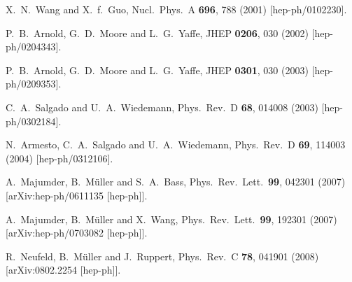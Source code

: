 \documentclass[letter,11pt]{article}
\begin{document}
\begin{thebibliography}{99}
  X.~N.~Wang and X.~f.~Guo,
  Nucl.\ Phys.\ A {\bf 696}, 788 (2001)
  [hep-ph/0102230].
  
  P.~B.~Arnold, G.~D.~Moore and L.~G.~Yaffe,
  JHEP {\bf 0206}, 030 (2002)
  [hep-ph/0204343].

  P.~B.~Arnold, G.~D.~Moore and L.~G.~Yaffe,
  JHEP {\bf 0301}, 030 (2003)
  [hep-ph/0209353].
  
  C.~A.~Salgado and U.~A.~Wiedemann,
  Phys.\ Rev.\ D {\bf 68}, 014008 (2003)
  [hep-ph/0302184].

  N.~Armesto, C.~A.~Salgado and U.~A.~Wiedemann,
  Phys.\ Rev.\ D {\bf 69}, 114003 (2004)
  [hep-ph/0312106].

A.~Majumder, B.~M\"uller and S.~A.~Bass,
Phys.\ Rev.\ Lett.\  \textbf{99}, 042301 (2007)
[arXiv:hep-ph/0611135 [hep-ph]].

A.~Majumder, B.~M\"uller and X.~Wang,
Phys.\ Rev.\ Lett.\  \textbf{99}, 192301 (2007)
[arXiv:hep-ph/0703082 [hep-ph]].

R.~Neufeld, B.~M\"uller and J.~Ruppert,
Phys.\ Rev.\ C \textbf{78}, 041901 (2008)
[arXiv:0802.2254 [hep-ph]].


\end{thebibliography}
\end{document}
